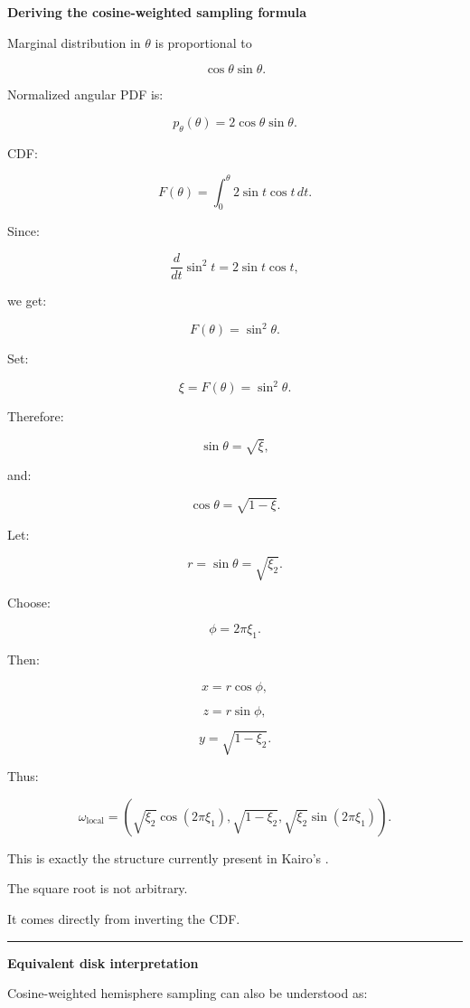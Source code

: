 \textbf{Deriving the cosine-weighted sampling formula}

Marginal distribution in \(\theta\) is proportional to

\[
\cos\theta\sin\theta.
\]

Normalized angular PDF is:

\[
p_\theta(\theta)
=
2\cos\theta\sin\theta.
\]

CDF:

\[
F(\theta)
=
\int_0^\theta
2\sin t\cos t\,dt.
\]

Since:

\[
\frac{d}{dt}\sin^2t
=
2\sin t\cos t,
\]

we get:

\[
\boxed{
F(\theta)
=
\sin^2\theta.
}
\]

Set:

\[
\xi=F(\theta)
=
\sin^2\theta.
\]

Therefore:

\[
\sin\theta
=
\sqrt{\xi},
\]

and:

\[
\cos\theta
=
\sqrt{1-\xi}.
\]

Let:

\[
r=\sin\theta=\sqrt{\xi_2}.
\]

Choose:

\[
\phi=2\pi\xi_1.
\]

Then:

\[
x=r\cos\phi,
\]

\[
z=r\sin\phi,
\]

\[
y=\sqrt{1-\xi_2}.
\]

Thus:

\[
\boxed{
\omega_{\text{local}}
=
\left(
\sqrt{\xi_2}\cos(2\pi\xi_1),
\sqrt{1-\xi_2},
\sqrt{\xi_2}\sin(2\pi\xi_1)
\right).
}
\]

This is exactly the structure currently present in Kairo's .

The square root is not arbitrary.

It comes directly from inverting the CDF.

\begin{center}\rule{0.5\linewidth}{0.5pt}\end{center}

\textbf{Equivalent disk interpretation}

Cosine-weighted hemisphere sampling can also be understood as:

